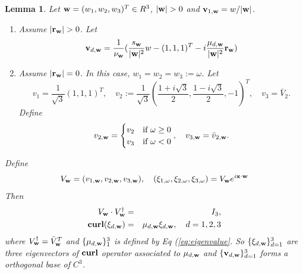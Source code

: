 \documentclass[10pt,reqno]{amsart}
\renewcommand{\(}{\left(}
\renewcommand{\)}{\right)}
\newcommand{\bv}{{\bf v}}
\newcommand{\bw}{{\bf w}}
\newcommand{\CU}{{\bf curl}}
\newcommand{\bx}{\mathbf{x}}
\newcommand{\br}{{\mathbf r}}
\newtheorem{lem}[theo]{Lemma}
\numberwithin{equation}{section}
\begin{document}
\begin{lem}\label{prop:curl-2} \label{lem-eigenvalues}  Let ${\bw}=(w_1,w_2,w_3)^T\in R^3$, $|\bw|>0$ and 
		$\bv_{1,\bw} = w/|\bw|$.
	\begin{enumerate}
	\item Assume $|{\br}_{\bw}|>0$.  Let 
\[
	{\bv}_{d,\bw} = \frac{1}{\nu_{\bw}}(\frac{s_{\bw}}{|\bw|^2} w-(1,1,1)^T - i\frac{\mu_{d,\bw}}{|\bw|^2} {\br}_{\bw} )   
\]
	\item Assume $|{\br}_{\bw}|=0$. In this case, $w_1=w_2=w_3:= \omega$.  Let 	%
	\[
	v_1 = \frac{1}{\sqrt 3}(1,1,1)^T,\quad {v}_{2} := \frac{1}{\sqrt{3}}(\frac{1+i\sqrt 3}2, \frac{1-i\sqrt 3}{2}, -1)^T, \quad v_3 = \bar{V}_2.	
	\]
 Define
 \[
	v_{2,\bw} = 
	\begin{cases} 
		v_2 & \text{if } \omega \ge  0 \\ 
		v_3 & \text{if }  \omega < 0 
	\end{cases}, \quad v_{3,\bw} = \bar {v}_{2,\bw}.
\]
\end{enumerate}
Define
\[
	V_{\bw} = (v_{1,\bw},v_{2,\bw},v_{3,\bw}), \quad (\xi_{1,\omega},\xi_{2,\omega},\xi_{3,\omega}) = V_{\bw} e^{i\bx \cdot \bw}
\]
 Then   
	\begin{eqnarray}
		V_{\bw} \cdot V_{\bw}^{\dagger} &=& I_3, \label{eq:normality_general}\\	
		\CU (\xi_{d,\bw}) &=&\mu_{d,\bw} \xi_{d, \bw}, \quad d=1,2,3 \label{eq:eigen_vector_general}
	\end{eqnarray}
where $ V_{\bw}^{\dagger} =  \bar V_{\bw}^{T} $ and $\{ \mu_{d,\bw}\}_1^3$ is defined by Eq (\ref{eq:eigenvalue}.
	So $\{{\xi}_{d,\bw}\}^3_{d=1}$ are three eigenvectors of $\CU$ operator associated to $\mu_{d,\bw}$ and $\{{\bv}_{d,\bw}\}^3_{d=1}$ forms a orthogonal base of $C^3$. 
\end{lem}
\end{document}
